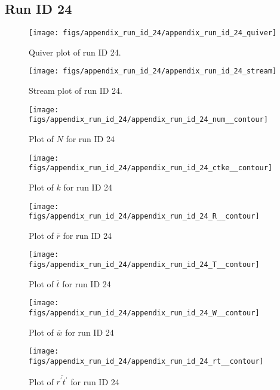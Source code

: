 \subsection{Run ID 24}
\begin{figure}[H]
\centering
\texttt{[image: figs/appendix\_run\_id\_24/appendix\_run\_id\_24\_quiver]}
\caption{Quiver plot of run ID 24.}
\label{fig:appendix_run_id_24_quiver}
\end{figure}


\begin{figure}[H]
\centering
\texttt{[image: figs/appendix\_run\_id\_24/appendix\_run\_id\_24\_stream]}
\caption{Stream plot of run ID 24.}
\label{fig:appendix_run_id_24_stream}
\end{figure}


\begin{figure}[H]
\centering
\texttt{[image: figs/appendix\_run\_id\_24/appendix\_run\_id\_24\_num\_\_contour]}
\caption{Plot of $N$ for run ID 24}
\label{fig:appendix_run_id_24_num__contour}
\end{figure}


\begin{figure}[H]
\centering
\texttt{[image: figs/appendix\_run\_id\_24/appendix\_run\_id\_24\_ctke\_\_contour]}
\caption{Plot of $k$ for run ID 24}
\label{fig:appendix_run_id_24_ctke__contour}
\end{figure}


\begin{figure}[H]
\centering
\texttt{[image: figs/appendix\_run\_id\_24/appendix\_run\_id\_24\_R\_\_contour]}
\caption{Plot of $\overline{r}$ for run ID 24}
\label{fig:appendix_run_id_24_R__contour}
\end{figure}


\begin{figure}[H]
\centering
\texttt{[image: figs/appendix\_run\_id\_24/appendix\_run\_id\_24\_T\_\_contour]}
\caption{Plot of $\overline{t}$ for run ID 24}
\label{fig:appendix_run_id_24_T__contour}
\end{figure}


\begin{figure}[H]
\centering
\texttt{[image: figs/appendix\_run\_id\_24/appendix\_run\_id\_24\_W\_\_contour]}
\caption{Plot of $\overline{w}$ for run ID 24}
\label{fig:appendix_run_id_24_W__contour}
\end{figure}


\begin{figure}[H]
\centering
\texttt{[image: figs/appendix\_run\_id\_24/appendix\_run\_id\_24\_rt\_\_contour]}
\caption{Plot of $\overline{r^\prime t^\prime}$ for run ID 24}
\label{fig:appendix_run_id_24_rt__contour}
\end{figure}


